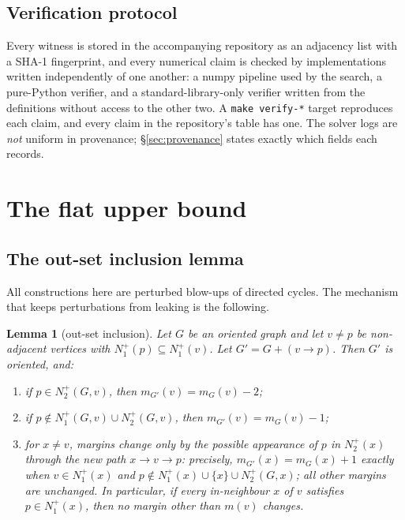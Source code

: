 \documentclass[11pt]{amsart}
\newtheorem{lemma}[theorem]{Lemma}
\theoremstyle{remark}
\begin{document}
\subsection*{Verification protocol}
Every witness is stored in the accompanying repository as an adjacency list
with a SHA-1 fingerprint, and every numerical claim is checked by
implementations written independently of one another: a numpy pipeline used by
the search, a pure-Python verifier, and a standard-library-only verifier
written from the definitions without access to the other two. A
\texttt{make verify-*} target reproduces each claim, and every claim in the
repository's table has one. The solver logs are \emph{not} uniform in
provenance; \S\ref{sec:provenance} states exactly which fields each records.

\section{The flat upper bound}\label{sec:constructions}

\subsection{The out-set inclusion lemma}

All constructions here are perturbed blow-ups of directed cycles. The
mechanism that keeps perturbations from leaking is the following.

\begin{lemma}[out-set inclusion]\label{lem:outset}
Let $G$ be an oriented graph and let $v \ne p$ be non-adjacent vertices with
$N_1^+(p) \subseteq N_1^+(v)$. Let $G' = G + (v \to p)$. Then $G'$ is
oriented, and:
\begin{enumerate}
\item[(i)] if $p \in N_2^+(G, v)$, then $m_{G'}(v) = m_G(v) - 2$;
\item[(ii)] if $p \notin N_1^+(G,v) \cup N_2^+(G, v)$, then
  $m_{G'}(v) = m_G(v) - 1$;
\item[(iii)] for $x \ne v$, margins change only by the possible appearance of
  $p$ in $N_2^+(x)$ through the new path $x \to v \to p$: precisely,
  $m_{G'}(x) = m_G(x) + 1$ exactly when $v \in N_1^+(x)$ and
  $p \notin N_1^+(x) \cup \{x\} \cup N_2^+(G, x)$; all other margins are
  unchanged. In particular, if every in-neighbour $x$ of $v$ satisfies
  $p \in N_1^+(x)$, then no margin other than $m(v)$ changes.
\end{enumerate}
\end{lemma}
\end{document}
